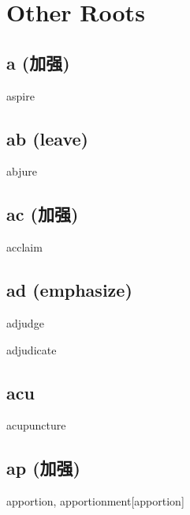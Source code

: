 \chapter{Other Roots}

\section{a (加强)}

\begin{RefWord}{aspire}
\end{RefWord}


\section{ab (leave)}
\begin{RefWord}{abjure}
\end{RefWord}


\section{ac (加强)}

\begin{RefWord}{acclaim}
\end{RefWord}

\section{ad (emphasize)}
\begin{RefWord}{adjudge}
\end{RefWord}


\begin{RefWord}{adjudicate}
\end{RefWord}

\section{acu}

\begin{RefWord}{acupuncture}
    
\end{RefWord}

\section{ap (加强)}

\begin{RefWord}{apportion, apportionment}[apportion]
\end{RefWord}

